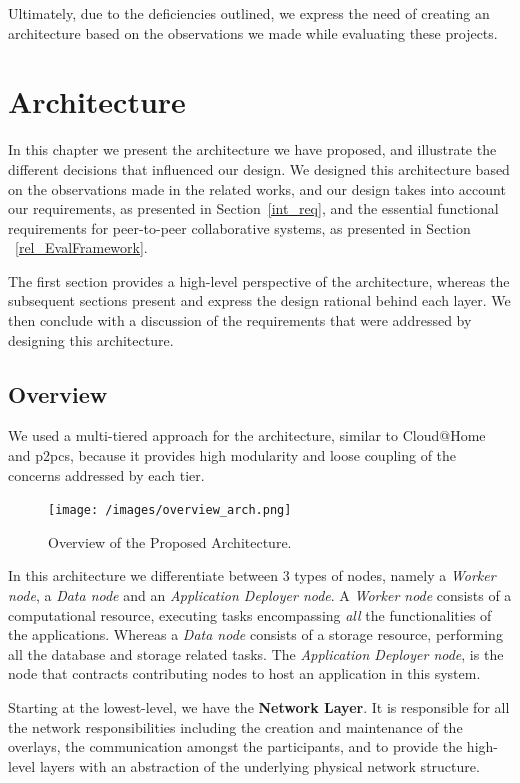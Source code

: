 \documentclass[12pt, titlepage]{uo_temp}
\begin{document}
     Ultimately, due to the deficiencies outlined, we express the need of creating an
     architecture based on the observations we made while evaluating these projects.

     \chapter{Architecture}\label{arch_chap}
     In this chapter we present the architecture we have proposed, and illustrate the
     different decisions that influenced our design. We designed this architecture based
     on the observations made in the related works, and our design takes into account our
     requirements, as presented in Section~\ref{int_req}, and the essential functional
     requirements for peer-to-peer collaborative systems, as presented in Section
     ~\ref{rel_EvalFramework}.

     The first section provides a high-level perspective of the architecture, whereas the
     subsequent sections present and express the design rational behind each layer. We
     then conclude with a discussion of the requirements that were addressed by designing
     this architecture.

     \section{Overview}\label{arch_over}
     We used a multi-tiered approach for the architecture, similar to Cloud@Home and
     \gls{p2pcs}, because it provides high modularity and loose coupling of the concerns
     addressed by each tier.
     \begin{figure}[h]
       \texttt{[image: /images/overview\_arch.png]}
       \caption{Overview of the Proposed Architecture.}
     \end{figure}
     In this architecture we differentiate between 3 types of nodes, namely a \emph{Worker
       node}, a \emph{Data node} and an \emph{Application Deployer node}. A \emph{Worker
       node} consists of a computational resource, executing tasks encompassing \emph{all}
     the functionalities of the applications. Whereas a \emph{Data node} consists of a
     storage resource, performing all the database and storage related tasks. The
     \emph{Application Deployer node}, is the node that contracts contributing nodes to
     host an application in this system.

     Starting at the lowest-level, we have the \textbf{Network Layer}. It is responsible
     for all the network responsibilities including the creation and maintenance of the
     overlays, the communication amongst the participants, and to provide the high-level
     layers with an abstraction of the underlying physical network structure.
\end{document}
